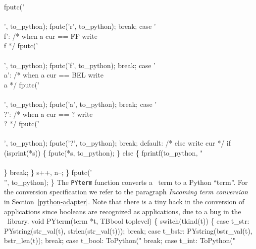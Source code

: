         fputc('\\\\', to_python);
        fputc('r', to_python);
        break;
      case '\\f':                /* when a cur == FF write \\f */
        fputc('\\\\', to_python);
        fputc('f', to_python);
        break;
      case '\\a':                /* when a cur == BEL write \\a */
        fputc('\\\\', to_python);
        fputc('a', to_python);
        break;
      case '\\?':                /* when a cur == ? write \\? */
        fputc('\\\\', to_python);
        fputc('?', to_python);
        break;
      default:                  /* else write cur */
        if (isprint(*s)) \{
          fputc(*s, to_python);
        \} else \{
          fprintf(to_python, "\\\\%
        \}
        break;
    \}
    s++, n--;
  \}
  fputc('\\'', to_python);
\}
\nwendcode{}\nwdocspar
The \texttt{PYterm} function converts a \TB\ term to a Python
``term''. For the conversion specification we refer to the paragraph
\emph{Incoming term conversion} in Section~\ref{python-adapter}.  Note
that there is a tiny hack in the conversion of applications since
booleans are recognized as applications, due to a bug in the \TB\
library. 
\nwenddocs{}\plusendmoddef\nwstartdeflinemarkup{}\nwenddeflinemarkup
void PYterm(term *t, TBbool toplevel) \{
  switch(tkind(t)) \{
    case t_str:
      PYstring(str_val(t), strlen(str_val(t)));
      break;
    case t_bstr:
      PYstring(bstr_val(t), bstr_len(t));
      break;
    case t_bool:
      ToPython("%
      break;
    case t_int:
      ToPython("%
